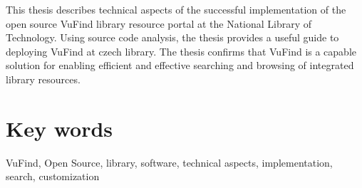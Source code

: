 This thesis describes technical aspects of the successful implementation of the open source VuFind library resource portal at the National Library of Technology. Using source code analysis, the thesis provides a useful guide to deploying VuFind at czech library. The thesis confirms that VuFind is a capable solution for enabling efficient and effective searching and browsing of integrated library resources.



{\let\clearpage\relax \chapter*{Key words}}

VuFind, Open Source, library, software, technical aspects, implementation, search, customization
